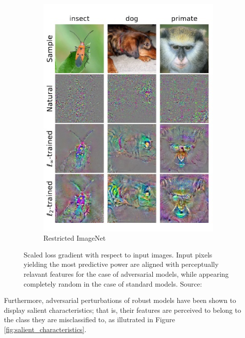 \begin{figure}[H]
\begin{subfigure}[b]{0.35\textwidth}
        \centering
        \includegraphics[width=\textwidth]{img/introduction/adversarial_loss_2.jpg}
        \caption{Restricted ImageNet}
    \end{subfigure}
       \caption{Scaled loss gradient with respect to input images.
       Input pixels yielding the most predictive power are aligned 
       with perceptually relavant features for the case of adversarial
       models, while appearing completely random in the case of 
       standard models.
       Source: \cite{tsiprasRobustnessMayBe2019}}
       \label{fig:adversarial_loss}
\end{figure}

Furthermore, adversarial perturbations of robust models have 
been shown to display salient characteristics;
that is, their features are perceived to belong to the
class they are misclassified to, as illutrated in 
Figure \ref{fig:salient_characteristics}. 

